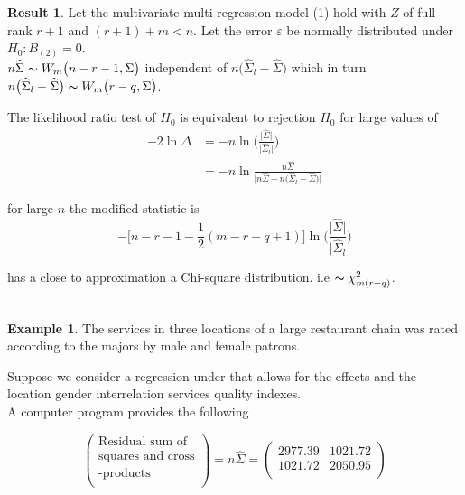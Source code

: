 \documentclass[11pt,a4paper]{article}
\theoremstyle{definition}
\newtheorem{exa}[thm]{Example}
\newtheorem{result}[thm]{Result}
\begin{document}
\begin{result}
Let the multivariate multi regression model (1) hold with $Z$ of full rank $r+1$ and $(r+1)+m<n$. Let the error $\varepsilon$ be normally distributed under $H_0: B_{(2)} =0$.\\
$n\widehat{\Sigma}\thicksim W_m\big(n-r-1, \Sigma\big)$ independent of $n\big(\widehat{\Sigma}_l-\widehat{\Sigma}\big)$ which in turn $n\big(\widehat{\Sigma}_l-\widehat{\Sigma}\big)\thicksim W_m\big(r-q,\Sigma\big)$.\\
\end{result}

The likelihood ratio test of $H_0$ is equivalent to rejection $H_0$ for large values of 
\begin{align*}
-2\ln \Delta & = -n\ln \Bigg(\frac{\big|\widehat{\Sigma}\big|}{\big|\widehat{\Sigma}_l\big|}\Bigg)\\\
& = -n\ln \frac{n\widehat{\Sigma}}{\Big|n\widehat{\Sigma}+n\big(\widehat{\Sigma}_l-\widehat{\Sigma}\big)\Big|}
\end{align*}

for large $n$ the modified statistic is 
$$-\big[n-r-1-\frac{1}{2}(m-r+q+1)\big]\ln \Bigg(\frac{\big|\widehat{\Sigma}\big|}{\big|\widehat{\Sigma}_l}\Bigg)$$

has a close to approximation a Chi-square distribution. i.e $\thicksim \chi^2_{m(r-q)}$.\\\\



\begin{exa}
The services in three locations of a large restaurant chain was rated according to the majors by male and female patrons.\\
\end{exa}

Suppose we consider a regression under that allows for the effects and the location gender interrelation services quality indexes.\\
A computer program provides the following

$$\begin{pmatrix}
\text{Residual sum of}\\
\text{squares and cross}\\
\text{-products}\\
\end{pmatrix}= n\widehat{\Sigma}=
\begin{pmatrix}
2977.39 & 1021.72\\
1021.72 & 2050.95\\
\end{pmatrix}$$\\
\end{document}
